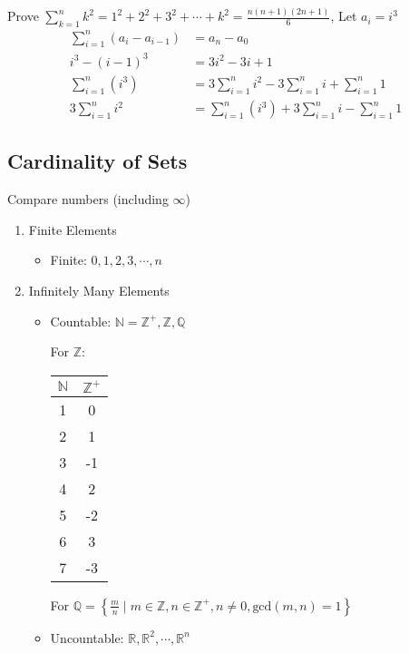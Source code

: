 \documentclass{article}
\begin{document}
Prove $ \sum_{k = 1}^{n} k^2 = 1^2 + 2^2 + 3^2 + \cdots + k^2 = \frac{ n \left( n + 1 \right) \left( 2n + 1 \right) }{ 6 } $, Let $ a_i = i^3 $
\begin{align*}
	\sum_{i = 1}^{n} \left( a_{i} - a_{i - 1} \right) & = a_{n} - a_0                                                                     \\
	i^3 - (i - 1)^{3}                                 & = 3i^2 - 3i + 1                                                                   \\
	\sum_{i = 1}^{n} \left( i^3 \right)               & = 3 \sum_{i = 1}^{n} i^2 - 3 \sum_{i = 1}^{n} i + \sum_{i = 1}^{n} 1              \\
	3 \sum_{i = 1}^{n} i^2                            & = \sum_{i = 1}^{n} \left( i^3 \right) + 3 \sum_{i = 1}^{n} i - \sum_{i = 1}^{n} 1
\end{align*}

\subsection{Cardinality of Sets}

Compare numbers (including $ \infty $)

\begin{enumerate}
	\item Finite Elements
	      \begin{itemize}
		      \item Finite: $ 0, 1, 2, 3, \cdots, n $
	      \end{itemize}

	\item Infinitely Many Elements
	      \begin{itemize}
		      \item Countable: $ \mathbb{N} = \mathbb{Z}^{+}, \mathbb{Z}, \mathbb{Q} $

		            For $ \mathbb{Z} $:
		            \begin{tabular}{ | c | c | }
			            $ \mathbb{N} $ & $ \mathbb{Z}^{+} $ \\
			            \hline
			            1              & 0                  \\
			            2              & 1                  \\
			            3              & -1                 \\
			            4              & 2                  \\
			            5              & -2                 \\
			            6              & 3                  \\
			            7              & -3
		            \end{tabular}

		            For $ \mathbb{Q} = \left\{ \frac{ m }{ n } \mid m \in \mathbb{Z}, n \in \mathbb{Z}^{+}, n \neq 0, \text{gcd}\left( m, n \right) = 1 \right\} $

		      \item Uncountable: $ \mathbb{R}, \mathbb{R}^2, \cdots, \mathbb{R}^{n} $
	      \end{itemize}
\end{enumerate}
\end{document}
